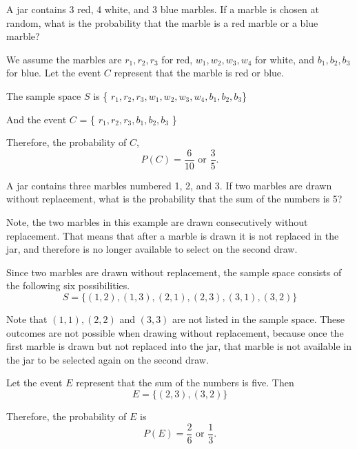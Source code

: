 \begin{example}
    A jar contains 3 red, 4 white, and 3 blue marbles. If a marble is chosen at random, what is the probability that the marble is a red marble or a blue marble?
\end{example}
\begin{solution}
    We assume the marbles are \( r_1, r_2, r_3 \) for red, \( w_1, w_2, w_3, w_4 \) for white, and \( b_1, b_2, b_3 \) for blue. Let the event \( C \) represent that the marble is red or blue.

    The sample space \( S \) is \{ \( r_1, r_2, r_3, w_1, w_2, w_3, w_4, b_1, b_2, b_3 \)\}

    And the event \( C \) = \{ \( r_1, r_2, r_3, b_1, b_2, b_3\) \}

    Therefore, the probability of \( C \),
    \[ P(C) = \frac{6}{10} \text{ or } \frac{3}{5}. \]
\end{solution}

\begin{example}\label{example_three_labeled_marbles_without_replacement_equal_5}
    A jar contains three marbles numbered 1, 2, and 3. If two marbles are drawn without replacement, what is the probability that the sum of the numbers is 5?
\end{example}
\begin{solution}
    Note, the two marbles in this example are drawn consecutively without replacement. That means that after a marble is drawn it is not replaced in the jar, and therefore is no longer available to select on the second draw.

    Since two marbles are drawn without replacement, the sample space consists of the following six possibilities.
    \[ S = \{ (1, 2), (1, 3), (2, 1), (2, 3), (3, 1), (3, 2) \} \]

    Note that \( (1,1), (2,2) \) and \( (3,3) \) are not listed in the sample space. These outcomes are not possible when drawing without replacement, because once the first marble is drawn but not replaced into the jar, that marble is not available in the jar to be selected again on the second draw.

    Let the event \( E \) represent that the sum of the numbers is five. Then
    \[ E = \{ (2, 3), (3, 2) \} \]

    Therefore, the probability of \( E \) is
    \[ P(E) = \frac{2}{6} \text{ or } \frac{1}{3}. \]
\end{solution}

